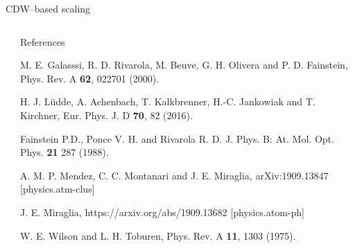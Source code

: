 \documentclass[final]{beamer}
\begin{document}
\begin{frame}[t]
\begin{columns}[t]
\begin{column}{.44\textwidth}
\begin{block}{CDW--based scaling}
\end{block}
\end{column} %
\begin{column}{.02\textwidth}
\end{column} %
\end{columns} %
\begin{columns}[t] 
\begin{column}{.03\textwidth}
\end{column} %
\begin{column}{.8\textwidth} 
\begin{block}{References}

\vspace{-1.9cm}
\begin{multicols}{2}
\begin{thebibliography}{9}
 
M. E. Galasssi, R. D. Rivarola, M. Beuve, G. H. Olivera and P. D. Fainstein, 
Phys. Rev. A \textbf{62}, 022701 (2000).

\vspace{-0.75cm}
H. J. L\"udde, A. Achenbach, T. Kalkbrenner, H.-C. Jankowiak and T. Kirchner,
Eur. Phys. J. D \textbf{70}, 82 (2016).

\vspace{-0.75cm}
Fainstein P.D., Ponce V. H. and Rivarola R. D. 
J. Phys. B: At. Mol. Opt. Phys. \textbf{21} 287 (1988).

\vspace{-0.75cm}
A. M. P. Mendez, C. C. Montanari and J. E. Miraglia,
arXiv:1909.13847 [physics.atm-clus]

\vspace{-0.75cm}
J. E. Miraglia, 
https://arxiv.org/abs/1909.13682 [physics.atom-ph]

\vspace{-0.75cm}
W. E. Wilson and L. H. Toburen,
Phys. Rev. A \textbf{11}, 1303 (1975).


\end{thebibliography}
\end{multicols}
\end{block}
\end{column}
\end{columns}
\end{frame}
\end{document}
